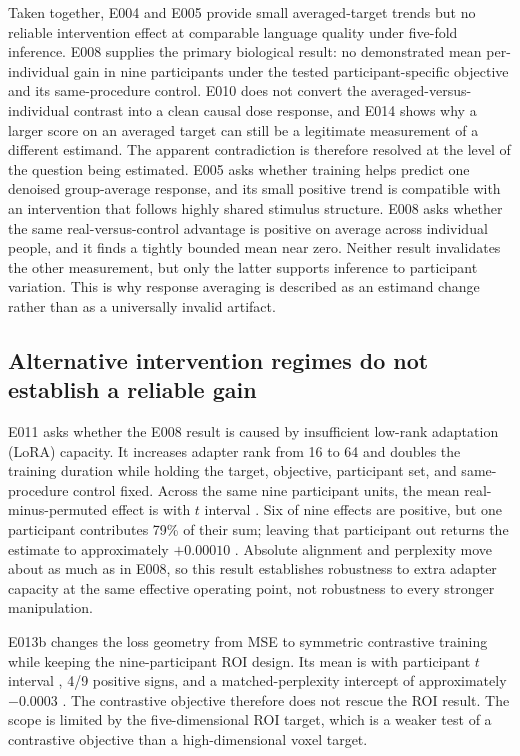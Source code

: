 Taken together, E004 and E005 provide small averaged-target trends but no reliable intervention effect at comparable language quality under five-fold inference.
E008 supplies the primary biological result: no demonstrated mean per-individual gain in nine participants under the tested participant-specific objective and its same-procedure control.
E010 does not convert the averaged-versus-individual contrast into a clean causal dose response, and E014 shows why a larger score on an averaged target can still be a legitimate measurement of a different estimand.
The apparent contradiction is therefore resolved at the level of the question being estimated.
E005 asks whether training helps predict one denoised group-average response, and its small positive trend is compatible with an intervention that follows highly shared stimulus structure.
E008 asks whether the same real-versus-control advantage is positive on average across individual people, and it finds a tightly bounded mean near zero.
Neither result invalidates the other measurement, but only the latter supports inference to participant variation.
This is why response averaging is described as an estimand change rather than as a universally invalid artifact.

\subsection{Alternative intervention regimes do not establish a reliable gain}
\label{sec:results-alternatives}

E011 asks whether the E008 result is caused by insufficient low-rank adaptation (LoRA) capacity.
It increases adapter rank from 16 to 64 and doubles the training duration while holding the target, objective, participant set, and same-procedure control fixed.
Across the same nine participant units, the mean real-minus-permuted effect is  with $t$ interval  .
Six of nine effects are positive, but one participant contributes 79\% of their sum; leaving that participant out returns the estimate to approximately $+0.00010$ .
Absolute alignment and perplexity move about as much as in E008, so this result establishes robustness to extra adapter capacity at the same effective operating point, not robustness to every stronger manipulation.

E013b changes the loss geometry from MSE to symmetric contrastive training while keeping the nine-participant ROI design.
Its mean is  with participant $t$ interval , 4/9 positive signs, and a matched-perplexity intercept of approximately $-0.0003$ .
The contrastive objective therefore does not rescue the ROI result.
The scope is limited by the five-dimensional ROI target, which is a weaker test of a contrastive objective than a high-dimensional voxel target.

